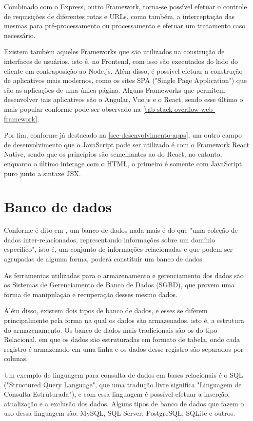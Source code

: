 Combinado com o Express, outro Framework, torna-se possível efetuar o controle de requisições de diferentes rotas e URLs, como também, a interceptação das mesmas para pré-processamento ou processamento e efetuar um tratamento caso necessário.

Existem também aqueles Frameworks que são utilizados na construção de interfaces de usuários, isto é, no Frontend, com isso são executados do lado do cliente em contraposição ao Node.js. Além disso, é possível efetuar a construção de aplicativos mais modernos, como os sites SPA ("Single Page Application") que são as aplicações de uma única página. Alguns Frameworks que permitem desenvolver tais aplicativos são o Angular, Vue.js e o React, sendo esse último o mais popular conforme pode ser observado na \autoref{tab-stack-overflow-web-framework}.

Por fim, conforme já destacado na \autoref{sec-desenvolvimento-apps}, um outro campo de desenvolvimento que o JavaScript pode ser utilizado é com o Framework React Native, sendo que os princípios são semelhantes ao do React, no entanto, enquanto o último interage com o HTML, o primeiro é somente com JavaScript puro junto a sintaxe JSX.

\section{Banco de dados}

Conforme é dito em \cite{silberschatz2016sistema}, um banco de dados nada mais é do que "uma coleção de dados inter-relacionados, representando informações sobre um domínio específico", isto é, um conjunto de informações relacionadas e que podem ser agrupadas de alguma forma, poderá constituir um banco de dados.

As ferramentas utilizadas para o armazenamento e gerenciamento dos dados são os Sistemas de Gerenciamento de Banco de Dados (SGBD), que provem uma forma de manipulação e recuperação desses mesmo dados.

Além disso, existem dois tipos de banco de dados, e esses se diferem principalmente pela forma na qual os dados são armazenados, isto é, a estrutura do armazenamento. Os banco de dados mais tradicionais são os do tipo Relacional, em que os dados são estruturadas em formato de tabela, onde cada registro é armazenado em uma linha e os dados desse registro são separados por colunas.

Um exemplo de linguagem para consulta de dados em bases relacionais é o SQL ("Structured Query Language", que uma tradução livre significa "Linguagem de Consulta Estruturada"), e com essa linguagem é possível efetuar a inserção, atualização e a exclusão dos dados. Alguns tipos de banco de dados que fazem o uso dessa linguagem são: MySQL, SQL Server, PostgreSQL, SQLite e outros.

